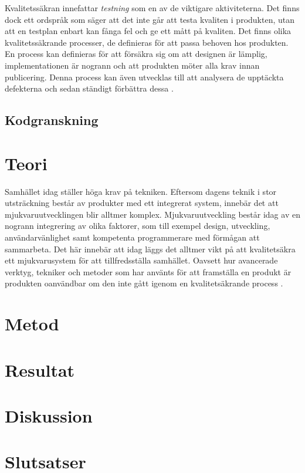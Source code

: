 Kvalitetssäkran innefattar \textit{testning} som en av de viktigare aktiviteterna. Det finns dock ett ordspråk som säger att det inte går att testa kvaliten i produkten, utan att en testplan enbart kan fånga fel och ge ett mått på kvaliten. Det finns olika kvalitetssäkrande processer, de definieras för att passa behoven hos produkten. En process kan definieras för att försäkra sig om att designen är lämplig, implementationen är nogrann och att produkten möter alla krav innan publicering. Denna process kan även utvecklas till att analysera de upptäckta defekterna och sedan ständigt förbättra dessa \cite{feldman2005quality}.


\subsection{Kodgranskning}


\clearpage

\section{Teori}
\label{sec:theory-wallstrom}

Samhället idag ställer höga krav på tekniken. Eftersom dagens teknik i stor utsträckning består av produkter med ett integrerat system, innebär det att mjukvaruutvecklingen blir alltmer komplex. Mjukvaruutveckling består idag av en nogrann integrering av olika faktorer, som till exempel design, utveckling, användarvänlighet samt kompetenta programmerare med förmågan att sammarbeta. Det här innebär att idag läggs det alltmer vikt på att kvalitetsäkra ett mjukvarusystem för att tillfredsställa samhället. Oavsett hur avancerade verktyg, tekniker och metoder som har använts för att framställa en produkt är produkten oanvändbar om den inte gått igenom en kvalitetsäkrande process \cite{gill2005factors}.





\section{Metod}
\label{sec:method-wallstrom}


\section{Resultat}
\label{sec:results-wallstrom}


\section{Diskussion}
\label{sec:discussion-wallstrom}


\section{Slutsatser}
\label{sec:conclusions-wallstrom}


